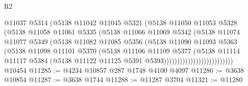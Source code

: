 \begin{lexlean}{R2}
\begin{coremodule}
                                  @11037
                                  @5314
                                  (@5138
                                    @11042
                                    @11045
                                    @5321
                                    (@5138
                                      @11050
                                      @11053
                                      @5328
                                      (@5138
                                        @11058
                                        @11061
                                        @5335
                                        (@5138
                                          @11066
                                          @11069
                                          @5342
                                          (@5138
                                            @11074
                                            @11077
                                            @5349
                                            (@5138
                                              @11082
                                              @11085
                                              @5356
                                              (@5138
                                                @11090
                                                @11093
                                                @5363
                                                (@5138
                                                  @11098
                                                  @11101
                                                  @5370
                                                  (@5138
                                                    @11106
                                                    @11109
                                                    @5377
                                                    (@5138
                                                      @11114
                                                      @11117
                                                      @5384
                                                      (@5138
                                                        @11122
                                                        @11125
                                                        @5391
                                                        @5393))))))))))))))))))))))))))
    @10454
@11285 := @4234 @10857 @287 @1748 @4100 @4097
@11286 := @3638 @10854
@11287 := @3638 @1744
@11288 := @11287 @3704
@11321 := @11280

\end{coremodule}
\end{lexlean}
